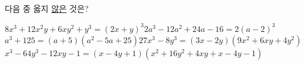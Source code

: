 다음 중 옳지 \underline{않은} 것은?
\begin{choicesv}{$8x^3+12x^2y+6xy^2+y^3=(2x+y)^3$}{$2a^3-12a^2+24a-16=2(a-2)^3$}{$a^3+125=(a+5)(a^2-5a+25)$}{$27x^3-8y^3=(3x-2y)(9x^2+6xy+4y^2)$}{$x^3-64y^3-12xy-1=(x-4y+1)(x^2+16y^2+4xy+x-4y-1)$}\end{choicesv}
